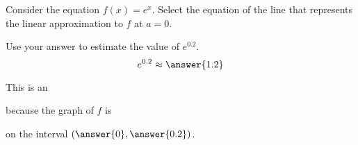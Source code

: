 \documentclass{ximera}
\author{Nela Lakos \and Kyle Parsons}
\begin{document}
\begin{exercise}

Consider the equation $f(x) = e^x$.  Select the equation of the line that represents the linear approximation to $f$ at $a=0$.
\begin{multipleChoice}
\end{multipleChoice}

Use your answer to estimate the value of $e^{0.2}$.
\[ e^{0.2} \approx \answer{1.2} \]

This is an
\begin{multipleChoice}
\end{multipleChoice}
because the graph of $f$ is 
\begin{multipleChoice}
\end{multipleChoice}
on the interval $\left( \answer{0}, \answer{0.2} \right)$.


\end{exercise}
\end{document}

